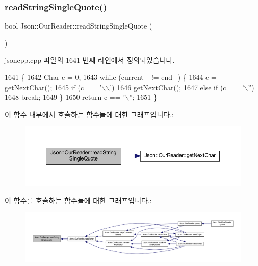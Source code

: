 \subsubsection{\texorpdfstring{read\+String\+Single\+Quote()}{readStringSingleQuote()}}
{\footnotesize\ttfamily bool Json\+::\+Our\+Reader\+::read\+String\+Single\+Quote (\begin{DoxyParamCaption}{ }\end{DoxyParamCaption})\hspace{0.3cm}{\ttfamily [private]}}



jsoncpp.\+cpp 파일의 1641 번째 라인에서 정의되었습니다.


\begin{DoxyCode}
1641                                       \{
1642   \hyperlink{class_json_1_1_our_reader_a0cd0bab4caa66594ab843ccd5f9dc239}{Char} c = 0;
1643   \textcolor{keywordflow}{while} (\hyperlink{class_json_1_1_our_reader_a5211fbbba94be80a22dd2317c621efcc}{current\_} != \hyperlink{class_json_1_1_our_reader_ab1f69b0260c27a0d2d65dc56e42c8f9d}{end\_}) \{
1644     c = \hyperlink{class_json_1_1_our_reader_a298285d035fdbc554caae09d9f0a5859}{getNextChar}();
1645     \textcolor{keywordflow}{if} (c == \textcolor{charliteral}{'\(\backslash\)\(\backslash\)'})
1646       \hyperlink{class_json_1_1_our_reader_a298285d035fdbc554caae09d9f0a5859}{getNextChar}();
1647     \textcolor{keywordflow}{else} \textcolor{keywordflow}{if} (c == \textcolor{charliteral}{'\(\backslash\)''})
1648       \textcolor{keywordflow}{break};
1649   \}
1650   \textcolor{keywordflow}{return} c == \textcolor{charliteral}{'\(\backslash\)''};
1651 \}
\end{DoxyCode}
이 함수 내부에서 호출하는 함수들에 대한 그래프입니다.\+:\nopagebreak
\begin{figure}[H]
\begin{center}
\leavevmode
\includegraphics[width=350pt]{class_json_1_1_our_reader_ac78592defdc333faf56c6d0908758da3_cgraph}
\end{center}
\end{figure}
이 함수를 호출하는 함수들에 대한 그래프입니다.\+:\nopagebreak
\begin{figure}[H]
\begin{center}
\leavevmode
\includegraphics[width=350pt]{class_json_1_1_our_reader_ac78592defdc333faf56c6d0908758da3_icgraph}
\end{center}
\end{figure}
